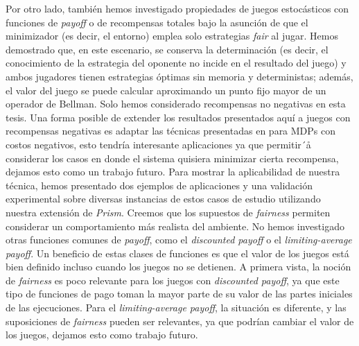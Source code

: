 Por otro lado, también hemos investigado propiedades de juegos estocásticos con funciones de \textit{payoff} o de recompensas totales bajo la asunción de que el minimizador (es decir, el entorno) emplea solo estrategias \textit{fair} al jugar.  
Hemos demostrado que, en este escenario, se conserva la determinación (es decir, el conocimiento de la estrategia del oponente no incide en el resultado del juego) y ambos jugadores tienen estrategias óptimas sin memoria y deterministas; además, el valor del juego se puede calcular aproximando un punto fijo mayor de un operador de Bellman. Solo hemos considerado recompensas no negativas en esta tesis. Una forma posible de extender los resultados presentados aquí a juegos con recompensas negativas es adaptar las técnicas presentadas en \cite{DBLP:conf/lics/Baier0DGS18} para MDPs con costos negativos, esto tendría interesante aplicaciones ya que permitir´å considerar los casos en donde el sistema quisiera minimizar cierta recompensa, dejamos esto como un trabajo futuro.
Para mostrar la aplicabilidad de nuestra técnica, hemos presentado dos ejemplos de aplicaciones y una validación experimental sobre diversas instancias de estos casos de estudio utilizando nuestra extensión de \emph{Prism}. Creemos que los supuestos de \textit{fairness} permiten considerar un comportamiento más realista del ambiente.
No hemos investigado otras funciones comunes de \textit{payoff}, como el \textit{discounted payoff} o el \textit{limiting-average payoff}. Un beneficio de estas clases de funciones es que el valor de los juegos está bien definido incluso cuando los juegos no se detienen.
A primera vista, la noción de \textit{fairness} es poco relevante para los juegos con \textit{discounted payoff}, ya que este tipo de funciones de pago toman la mayor parte de su valor de las partes iniciales de las ejecuciones. Para el \textit{limiting-average payoff}, la situación es diferente, y las suposiciones de \textit{fairness} pueden ser relevantes, ya que podrían cambiar el valor de los juegos, dejamos esto como trabajo futuro.

